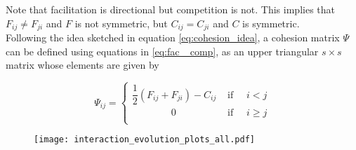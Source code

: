 \documentclass[titlepage,11pt]{article}
\begin{document}
\begin{linenumbers}
\begin{singlespace}
\begin{linenomath*}
					\end{linenomath*}
					Note that facilitation is directional but competition is not. This implies that $ F_{ij} \neq F_{ji}$ and $ F $ is not symmetric, but $ C_{ij} = C_{ji} $ and $ C $ is symmetric.\\
					Following the idea sketched in equation \ref{eq:cohesion_idea}, a cohesion matrix $ \Psi $ can be defined using equations in \ref{eq:fac _comp},  as an upper triangular $ s \times s $ matrix whose elements are given by
					\begin{linenomath*}
						\begin{equation}
							\Psi_{ij} = 
							\begin{cases}
								\dfrac12 \left(F_{ij} + F_{ji}\right) -  C_{ij} & \text{ if }  \quad i < j \\
							    \quad\quad\quad\quad	0 & \text{ if } \quad  i \geq j\\
							\end{cases}
						\end{equation}
					\end{linenomath*}
					\begin{figure}
						\centering			
						\texttt{[image: interaction\_evolution\_plots\_all.pdf]}

\end{figure}
\end{singlespace}
\end{linenumbers}
\end{document}
